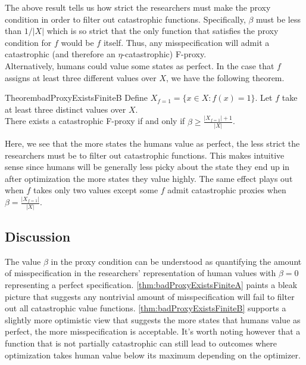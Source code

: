 \documentclass{article}
\begin{document}
The above result tells us how strict the researchers must make the proxy condition in order to filter out catastrophic functions. Specifically, $\beta$ must be less than $1/|X|$ which is so strict that the only function that satisfies the proxy condition for $f$ would be $f$ itself. Thus, any misspecification will admit a catastrophic (and therefore an $\eta$-catastrophic) F-proxy.\\

Alternatively, humans could value some states as perfect. In the case that $f$ assigns at least three different values over $X$, we have the following theorem.

\begin{restatable}{Theorem}{badProxyExistsFiniteB}\label{thm:badProxyExistsFiniteB}
Define $X_{f=1} = \{x \in X : f(x) = 1\}$. Let $f$ take at least three distinct values over $X$.\\ 
There exists a catastrophic F-proxy if and only if $\beta \geq \frac{|X_{f=1}|+1}{|X|}$.
\end{restatable}

Here, we see that the more states the humans value as perfect, the less strict the researchers must be to filter out catastrophic functions. This makes intuitive sense since humans will be generally less picky about the state they end up in after optimization the more states they value highly. The same effect plays out when $f$ takes only two values except some $f$ admit catastrophic proxies when $\beta = \frac{|X_{f=1}|}{|X|}$.

\subsection{Discussion}
The value $\beta$ in the proxy condition can be understood as quantifying the amount of misspecification in the researchers' representation of human values with $\beta=0$ representing a perfect specification. \cref{thm:badProxyExistsFiniteA} paints a bleak picture that suggests any nontrivial amount of misspecification will fail to filter out all catastrophic value functions. \cref{thm:badProxyExistsFiniteB} supports a slightly more optimistic view that suggests the more states that humans value as perfect, the more misspecification is acceptable. It's worth noting however that a function that is not partially catastrophic can still lead to outcomes where optimization takes human value below its maximum depending on the optimizer.\\
\end{document}
